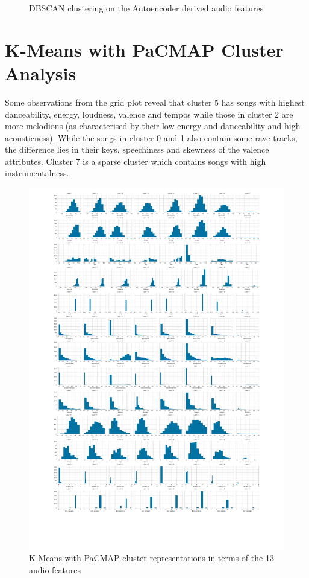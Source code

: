 \begin{appendix}
\begin{figure}
    \caption{DBSCAN clustering on the Autoencoder derived audio features}
    \label{fig:dbscan-sixth}
\end{figure}
\FloatBarrier
\section{K-Means with PaCMAP Cluster Analysis}
\label{appendix:D}
Some observations from the grid plot reveal that cluster 5 has songs with highest danceability, energy, loudness, valence and tempos while those in cluster 2 are more melodious (as characterised by their low energy and danceability and high acousticness). While the songs in cluster 0 and 1 also contain some rave tracks, the difference lies in their keys, speechiness and skewness of the valence attributes. Cluster 7 is a sparse cluster which contains songs with high instrumentalness.
\begin{figure}[!htb]
    \centering
    \includegraphics[scale=0.6]{Outputs/Best Algorithm Cluster Analysis.pdf}
    \caption{K-Means with PaCMAP cluster representations in terms of the 13 audio features}
    \label{fig:kmeans-pacmap}
\end{figure}
\clearpage

\end{appendix}
